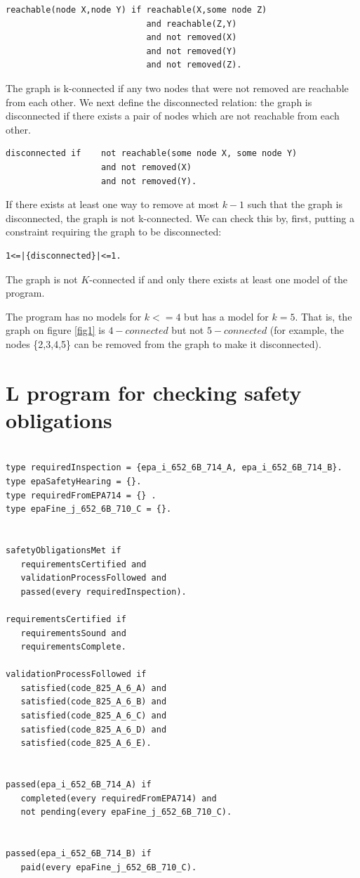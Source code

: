 \documentclass[a4paper,10pt]{article}
\begin{document}
\begin{verbatim}
reachable(node X,node Y) if reachable(X,some node Z)
                            and reachable(Z,Y) 
                            and not removed(X) 
                            and not removed(Y) 
                            and not removed(Z).
\end{verbatim}


\medskip\noindent
The graph is k-connected if any two nodes  that were not removed are reachable from each other.
We next define the disconnected relation: the graph is disconnected if there exists a pair of nodes which are not reachable from
each other.

\begin{verbatim}
disconnected if    not reachable(some node X, some node Y) 
                   and not removed(X)
                   and not removed(Y).                
\end{verbatim}
If there exists at least one way to remove at most $k-1$ such that the graph is disconnected, the graph is not k-connected.
We can check this by, first, putting a constraint requiring the graph to be disconnected:

\begin{verbatim}
1<=|{disconnected}|<=1.
\end{verbatim}

\medskip\noindent
The graph is not $K$-connected if and only there exists at least one model of the program.

\medskip\noindent
The program has no models for $k<=4$ but has a model for $k=5$. That is, the graph on figure \ref{fig1} is $4-connected$ but not $5-connected$ (for example, the nodes \{2,3,4,5\} can be removed from the graph to make it disconnected).



 

\pagebreak
\appendix
\section{L program for checking safety obligations}\label{A}

\begin{verbatim}

type requiredInspection = {epa_i_652_6B_714_A, epa_i_652_6B_714_B}.
type epaSafetyHearing = {}.
type requiredFromEPA714 = {} .
type epaFine_j_652_6B_710_C = {}.


safetyObligationsMet if
   requirementsCertified and
   validationProcessFollowed and
   passed(every requiredInspection).

requirementsCertified if
   requirementsSound and
   requirementsComplete.

validationProcessFollowed if
   satisfied(code_825_A_6_A) and
   satisfied(code_825_A_6_B) and
   satisfied(code_825_A_6_C) and
   satisfied(code_825_A_6_D) and
   satisfied(code_825_A_6_E).


passed(epa_i_652_6B_714_A) if
   completed(every requiredFromEPA714) and
   not pending(every epaFine_j_652_6B_710_C).


passed(epa_i_652_6B_714_B) if
   paid(every epaFine_j_652_6B_710_C).

\end{verbatim}
\pagebreak
\end{document}
